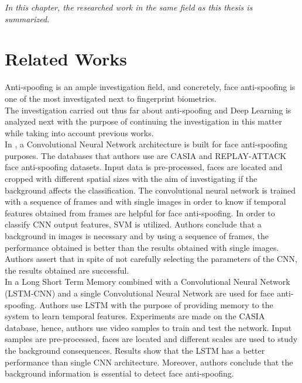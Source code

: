 
\begin{small}
\emph{In this chapter, the researched work in the same field as this thesis is summarized.}
\end{small}

\section{Related Works}
Anti-spoofing is an ample investigation field, and concretely, face anti-spoofing is one of the most investigated next to fingerprint biometrics.\\

The investigation carried out thus far about anti-spoofing and Deep Learning is analyzed next with the purpose of continuing the investigation in this matter while taking into account previous works.\\

In \cite{yangLL14}, a Convolutional Neural Network architecture is built for face anti-spoofing purposes.  The databases that authors use are CASIA and REPLAY-ATTACK face anti-spoofing datasets. Input data is pre-processed, faces are located and cropped with different spatial sizes with the aim of investigating if the background affects the classification. The convolutional neural network is trained with a sequence of frames and with single images in order to know if temporal features obtained from frames are helpful for face anti-spoofing. In order to classify CNN output features, SVM is utilized. Authors conclude that a background in images is necessary and by using a sequence of frames, the performance obtained is better than the results obtained with single images. Authors assert that in spite of not carefully selecting the parameters of the CNN, the results obtained are successful. \\

In \cite{LSTM-CNN} a Long Short Term Memory combined with a Convolutional Neural Network (LSTM-CNN) and a single Convolutional Neural Network are used for face anti-spoofing. Authors use LSTM with the purpose of providing memory to the system to learn temporal features. Experiments are made on the CASIA database, hence, authors use video samples to train and test the network. Input samples are pre-processed, faces are located and different scales are used to study the background consequences. Results show that the LSTM has a better performance than single CNN architecture. Moreover, authors conclude that the background information is essential to detect face anti-spoofing.\\

